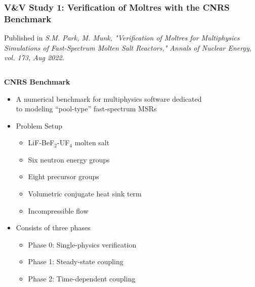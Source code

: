\begin{frame}
  \frametitle{V\&V Study 1: Verification of Moltres with the CNRS Benchmark}

  Published in \textit{S.M. Park, M. Munk, "Verification of Moltres for Multiphysics Simulations of
    Fast-Spectrum Molten Salt Reactors," Annals of Nuclear Energy, vol. 173, Aug 2022.}
  \begin{columns}
    \column[t]{6.5cm}
    \begin{block}{\textbf{CNRS Benchmark \cite{tiberga_results_2020}}}
      \begin{itemize}
        \item A numerical benchmark for multiphysics software dedicated to modeling ``pool-type''
          fast-spectrum MSRs
        \item Problem Setup
          \begin{itemize}
            \item LiF-BeF$_2$-UF$_4$ molten salt
            \item Six neutron energy groups
            \item Eight precursor groups
            \item Volumetric conjugate heat sink term
            \item Incompressible flow
          \end{itemize}
        \item Consists of three phases
          \begin{itemize}
            \item Phase 0: Single-physics verification
            \item Phase 1: Steady-state coupling
            \item Phase 2: Time-dependent coupling
          \end{itemize}
      \end{itemize}
    \end{block}
    \column[t]{3.5cm}
    \begin{figure}
      \centering

\end{figure}
\end{columns}
\end{frame}
